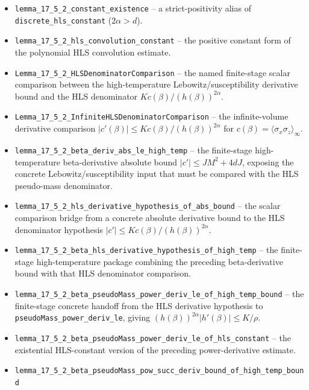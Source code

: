 \documentclass[a4paper,11pt]{article}
\begin{document}
\begin{itemize}
  bundle.  These do not require any upper-bound hypothesis, but they
  remain conditional on active-range membership of the anchored cubic
  pair correlation $\langle\sigma_0\sigma_z\rangle_\infty$ in $(0,2)$
  together with the tanh-power profile lower bound
  $g_\alpha(-\log(\beta J\,2d)) \le \langle\sigma_0\sigma_z\rangle_\infty$.
\item \texttt{lemma\_17\_5\_2\_constant\_existence} -- a strict-positivity
  alias of \texttt{discrete\_hls\_constant} ($2\alpha > d$).
\item \texttt{lemma\_17\_5\_2\_hls\_convolution\_constant} -- the
  positive constant form of the polynomial HLS convolution estimate.
\item \texttt{Lemma\_17\_5\_2\_HLSDenominatorComparison} -- the named
  finite-stage scalar comparison between the high-temperature
  Lebowitz/susceptibility derivative bound and the HLS denominator
  $Kc(\beta)/(h(\beta))^{2\alpha}$.
\item \texttt{Lemma\_17\_5\_2\_InfiniteHLSDenominatorComparison} -- the
  infinite-volume derivative comparison
  $|c'(\beta)|\le Kc(\beta)/(h(\beta))^{2\alpha}$ for
  $c(\beta)=\langle\sigma_x\sigma_z\rangle_\infty$.
\item \texttt{lemma\_17\_5\_2\_beta\_deriv\_abs\_le\_high\_temp} -- the
  finite-stage high-temperature beta-derivative absolute bound
  $|c'|\le J M^2 + 4dJ$, exposing the concrete Lebowitz/susceptibility
  input that must be compared with the HLS pseudo-mass denominator.
\item \texttt{lemma\_17\_5\_2\_hls\_derivative\_hypothesis\_of\_abs\_bound}
  -- the scalar comparison bridge from a concrete absolute derivative bound
  to the HLS denominator hypothesis
  $|c'|\le Kc(\beta)/(h(\beta))^{2\alpha}$.
\item \texttt{lemma\_17\_5\_2\_beta\_hls\_derivative\_hypothesis\_of\_high\_temp}
  -- the finite-stage high-temperature package combining the preceding
  beta-derivative bound with that HLS denominator comparison.
\item \texttt{lemma\_17\_5\_2\_beta\_pseudoMass\_power\_deriv\_le\_of\_high\_temp\_bound}
  -- the finite-stage concrete handoff from the HLS derivative hypothesis to
  \texttt{pseudoMass\_power\_deriv\_le}, giving
  $(h(\beta))^{2\alpha}|h'(\beta)|\le K/\rho$.
\item \texttt{lemma\_17\_5\_2\_beta\_pseudoMass\_power\_deriv\_le\_of\_hls\_constant}
  -- the existential HLS-constant version of the preceding power-derivative
  estimate.
\item \texttt{lemma\_17\_5\_2\_beta\_pseudoMass\_pow\_succ\_deriv\_bound\_of\_high\_temp\_bound}

\end{itemize}
\end{document}
